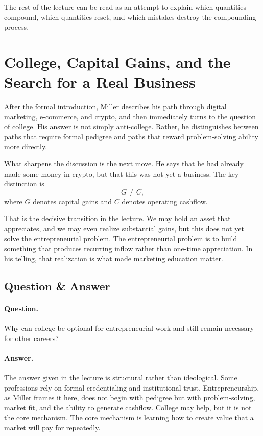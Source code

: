 The rest of the lecture can be read as an attempt to explain which quantities compound, which quantities reset, and which mistakes destroy the compounding process.

\section{College, Capital Gains, and the Search for a Real Business}

After the formal introduction, Miller describes his path through digital marketing, e-commerce, and crypto, and then immediately turns to the question of college. His answer is not simply anti-college. Rather, he distinguishes between paths that require formal pedigree and paths that reward problem-solving ability more directly.

What sharpens the discussion is the next move. He says that he had already made some money in crypto, but that this was not yet a business. The key distinction is
\begin{equation}
G \neq C,
\end{equation}
where \(G\) denotes capital gains and \(C\) denotes operating cashflow.

That is the decisive transition in the lecture. We may hold an asset that appreciates, and we may even realize substantial gains, but this does not yet solve the entrepreneurial problem. The entrepreneurial problem is to build something that produces recurring inflow rather than one-time appreciation. In his telling, that realization is what made marketing education matter.

\subsection{Question \& Answer}

\paragraph{Question.} Why can college be optional for entrepreneurial work and still remain necessary for other careers?

\paragraph{Answer.} The answer given in the lecture is structural rather than ideological. Some professions rely on formal credentialing and institutional trust. Entrepreneurship, as Miller frames it here, does not begin with pedigree but with problem-solving, market fit, and the ability to generate cashflow. College may help, but it is not the core mechanism. The core mechanism is learning how to create value that a market will pay for repeatedly.

